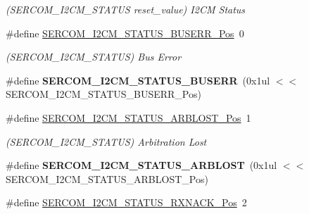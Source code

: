 \begin{DoxyCompactItemize}
\begin{DoxyCompactList}\small\item\em (S\+E\+R\+C\+O\+M\+\_\+\+I2\+C\+M\+\_\+\+S\+T\+A\+T\+U\+S reset\+\_\+value) I2\+C\+M Status \end{DoxyCompactList}\item 
\hypertarget{group___s_a_m_l21___s_e_r_c_o_m_gabd2448b6fb529ca68147673548f031ed}{}\#define \hyperlink{group___s_a_m_l21___s_e_r_c_o_m_gabd2448b6fb529ca68147673548f031ed}{S\+E\+R\+C\+O\+M\+\_\+\+I2\+C\+M\+\_\+\+S\+T\+A\+T\+U\+S\+\_\+\+B\+U\+S\+E\+R\+R\+\_\+\+Pos}~0\label{group___s_a_m_l21___s_e_r_c_o_m_gabd2448b6fb529ca68147673548f031ed}

\begin{DoxyCompactList}\small\item\em (S\+E\+R\+C\+O\+M\+\_\+\+I2\+C\+M\+\_\+\+S\+T\+A\+T\+U\+S) Bus Error \end{DoxyCompactList}\item 
\hypertarget{group___s_a_m_l21___s_e_r_c_o_m_ga17927940eed2ba9b582ea90371b0288a}{}\#define {\bfseries S\+E\+R\+C\+O\+M\+\_\+\+I2\+C\+M\+\_\+\+S\+T\+A\+T\+U\+S\+\_\+\+B\+U\+S\+E\+R\+R}~(0x1ul $<$$<$ S\+E\+R\+C\+O\+M\+\_\+\+I2\+C\+M\+\_\+\+S\+T\+A\+T\+U\+S\+\_\+\+B\+U\+S\+E\+R\+R\+\_\+\+Pos)\label{group___s_a_m_l21___s_e_r_c_o_m_ga17927940eed2ba9b582ea90371b0288a}

\item 
\hypertarget{group___s_a_m_l21___s_e_r_c_o_m_gac5ab7d2d7d0086785d30c3a1020f4d92}{}\#define \hyperlink{group___s_a_m_l21___s_e_r_c_o_m_gac5ab7d2d7d0086785d30c3a1020f4d92}{S\+E\+R\+C\+O\+M\+\_\+\+I2\+C\+M\+\_\+\+S\+T\+A\+T\+U\+S\+\_\+\+A\+R\+B\+L\+O\+S\+T\+\_\+\+Pos}~1\label{group___s_a_m_l21___s_e_r_c_o_m_gac5ab7d2d7d0086785d30c3a1020f4d92}

\begin{DoxyCompactList}\small\item\em (S\+E\+R\+C\+O\+M\+\_\+\+I2\+C\+M\+\_\+\+S\+T\+A\+T\+U\+S) Arbitration Lost \end{DoxyCompactList}\item 
\hypertarget{group___s_a_m_l21___s_e_r_c_o_m_ga4ae335e8d058fc9d5b30109ec2a9d6bd}{}\#define {\bfseries S\+E\+R\+C\+O\+M\+\_\+\+I2\+C\+M\+\_\+\+S\+T\+A\+T\+U\+S\+\_\+\+A\+R\+B\+L\+O\+S\+T}~(0x1ul $<$$<$ S\+E\+R\+C\+O\+M\+\_\+\+I2\+C\+M\+\_\+\+S\+T\+A\+T\+U\+S\+\_\+\+A\+R\+B\+L\+O\+S\+T\+\_\+\+Pos)\label{group___s_a_m_l21___s_e_r_c_o_m_ga4ae335e8d058fc9d5b30109ec2a9d6bd}

\item 
\hypertarget{group___s_a_m_l21___s_e_r_c_o_m_gad36a5253660fcd371b125d2e149a6e7d}{}\#define \hyperlink{group___s_a_m_l21___s_e_r_c_o_m_gad36a5253660fcd371b125d2e149a6e7d}{S\+E\+R\+C\+O\+M\+\_\+\+I2\+C\+M\+\_\+\+S\+T\+A\+T\+U\+S\+\_\+\+R\+X\+N\+A\+C\+K\+\_\+\+Pos}~2\label{group___s_a_m_l21___s_e_r_c_o_m_gad36a5253660fcd371b125d2e149a6e7d}


\end{DoxyCompactItemize}
